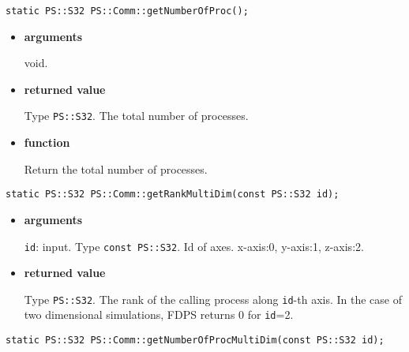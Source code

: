 
\begin{screen}
\begin{verbatim}
static PS::S32 PS::Comm::getNumberOfProc();
\end{verbatim}
\end{screen}

\begin{itemize}

\item{\bf arguments}

void.

\item{\bf returned value}

Type {\tt PS::S32}. The total number of processes.

\item{\bf function}

Return the total number of processes.

\end{itemize}


\begin{screen}
\begin{verbatim}
static PS::S32 PS::Comm::getRankMultiDim(const PS::S32 id);
\end{verbatim}
\end{screen}

\begin{itemize}

\item{\bf arguments}

{\tt id}: input. Type {\tt const PS::S32}. Id of axes. x-axis:0,
y-axis:1, z-axis:2.

\item{\bf returned value}

Type {\tt PS::S32}. The rank of the calling process along {\tt id}-th
axis. In the case of two dimensional simulations, FDPS returns 0 for
{\tt id}=2.


\end{itemize}


\begin{screen}
\begin{verbatim}
static PS::S32 PS::Comm::getNumberOfProcMultiDim(const PS::S32 id);
\end{verbatim}
\end{screen}

